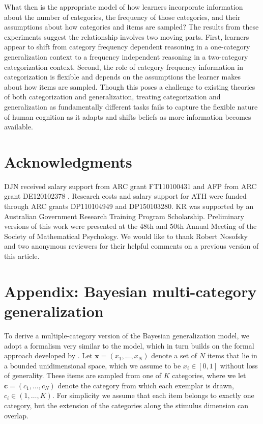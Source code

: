 \documentclass[doc,apacite]{apa6}
\begin{document}
What then is the appropriate model of how learners incorporate information about the number of categories, the frequency of those categories, and their assumptions about how categories and items are sampled? The results from these experiments suggest the relationship involves two moving parts. First, learners appear to shift from category frequency dependent reasoning in a one-category generalization context to a frequency independent reasoning in a two-category categorization context. Second, the role of category frequency information in categorization is flexible and depends on the assumptions the learner makes about how items are sampled. 
Though this poses a challenge to existing theories of both categorization and generalization, treating categorization and generalization as fundamentally different tasks fails to capture the flexible nature of human cognition as it adapts and shifts beliefs as more information becomes available.

\section{Acknowledgments}

DJN received salary support from ARC grant FT110100431 and AFP from ARC grant DE120102378 . Research costs and salary support for ATH were funded through ARC grants DP110104949 and DP150103280. KR was supported by an Australian Government Research Training Program Scholarship.
Preliminary versions of this work were presented at the 48th and 50th Annual Meeting of the Society of Mathematical Psychology. 
We would like to thank Robert Nosofsky and two anonymous reviewers for their helpful comments on a previous version of this article.


\nocite{*}



\section*{Appendix: Bayesian multi-category generalization}

To derive a multiple-category version of the Bayesian generalization model, we adopt a formalism very similar to the  model, which in turn builds on the formal approach developed by . Let $\bm{x}=(x_1,\ldots,x_N)$ denote a set of $N$ items that lie in a bounded unidimensional space, which we assume to be $x_i \in [0,1]$ without loss of generality. These items are sampled from one of $K$ categories, where we let $\bm{c}=(c_1,\ldots,c_N)$ denote the category from which each exemplar is drawn, $c_i \in (1,\ldots,K)$. For simplicity we assume that each item belongs to exactly one category, but the extension of the categories along the stimulus dimension can overlap. 
\end{document}

